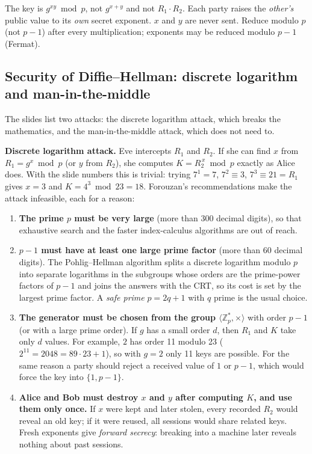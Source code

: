 \begin{trap}
The key is $g^{xy} \bmod p$, not $g^{x+y}$ and not $R_1 \cdot R_2$. Each party raises the \emph{other's} public value to its \emph{own} secret exponent. $x$ and $y$ are never sent. Reduce modulo $p$ (not $p - 1$) after every multiplication; exponents may be reduced modulo $p - 1$ (Fermat).
\end{trap}

\subsection{Security of Diffie--Hellman: discrete logarithm and man-in-the-middle \hot}

The slides list two attacks: the discrete logarithm attack, which breaks the mathematics, and the man-in-the-middle attack, which does not need to.

\textbf{Discrete logarithm attack.} Eve intercepts $R_1$ and $R_2$. If she can find $x$ from $R_1 = g^x \bmod p$ (or $y$ from $R_2$), she computes $K = R_2^{\,x} \bmod p$ exactly as Alice does. With the slide numbers this is trivial: trying $7^1 = 7$, $7^2 \equiv 3$, $7^3 \equiv 21 = R_1$ gives $x = 3$ and $K = 4^3 \bmod 23 = 18$. Forouzan's recommendations make the attack infeasible, each for a reason:
\begin{enumerate}
  \item \textbf{The prime $p$ must be very large} (more than 300 decimal digits), so that exhaustive search and the faster index-calculus algorithms are out of reach.
  \item \textbf{$p - 1$ must have at least one large prime factor} (more than 60 decimal digits). The Pohlig--Hellman algorithm splits a discrete logarithm modulo $p$ into separate logarithms in the subgroups whose orders are the prime-power factors of $p - 1$ and joins the answers with the CRT, so its cost is set by the largest prime factor. A \emph{safe prime} $p = 2q + 1$ with $q$ prime is the usual choice.
  \item \textbf{The generator must be chosen from the group $\langle \mathbb{Z}_p^*, \times\rangle$} with order $p - 1$ (or with a large prime order). If $g$ has a small order $d$, then $R_1$ and $K$ take only $d$ values. For example, $2$ has order 11 modulo 23 ($2^{11} = 2048 = 89 \cdot 23 + 1$), so with $g = 2$ only 11 keys are possible. For the same reason a party should reject a received value of $1$ or $p - 1$, which would force the key into $\{1, p - 1\}$.
  \item \textbf{Alice and Bob must destroy $x$ and $y$ after computing $K$, and use them only once.} If $x$ were kept and later stolen, every recorded $R_2$ would reveal an old key; if it were reused, all sessions would share related keys. Fresh exponents give \emph{forward secrecy}: breaking into a machine later reveals nothing about past sessions.
\end{enumerate}

